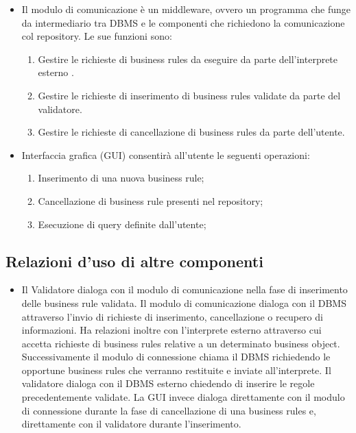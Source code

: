 \documentclass[11pt,titlepage,a4paper]{report}
\begin{document}
\begin{itemize}
\item Il modulo di comunicazione \`e un middleware, ovvero un programma che funge da intermediario tra DBMS e le componenti che richiedono la comunicazione col repository. Le sue funzioni sono:
\begin{enumerate}
\item Gestire le richieste di business rules da eseguire da parte dell'interprete esterno .
\item Gestire le richieste di inserimento di business rules validate da parte del validatore.
\item Gestire le richieste di cancellazione di business rules da parte dell'utente.%
\end{enumerate}

\item Interfaccia grafica (GUI) consentir\`a all'utente le seguenti operazioni:
\begin{enumerate}
\item Inserimento di una nuova business rule;
\item Cancellazione di business rule presenti nel repository;
\item Esecuzione di query definite dall'utente;
\end{enumerate}

\end{itemize}

\subsection{Relazioni d'uso di altre componenti}
\begin{itemize}
\item{Il Validatore dialoga con il modulo di comunicazione nella fase di inserimento delle business rule validata. }
Il modulo di comunicazione dialoga con il DBMS attraverso l'invio di richieste di inserimento, cancellazione o recupero di informazioni. Ha relazioni inoltre con l'interprete esterno attraverso cui accetta richieste di business rules relative a un determinato business object. Successivamente il modulo di connessione chiama il DBMS richiedendo le opportune business rules che verranno restituite e inviate all'interprete. Il validatore dialoga con il DBMS esterno chiedendo di inserire le regole precedentemente validate. La GUI invece dialoga direttamente con il modulo di connessione durante la fase di cancellazione di una business rules e, direttamente con il validatore durante l'inserimento.
\end{itemize}
\end{document}
